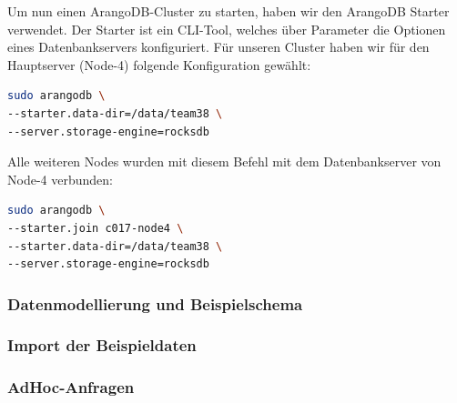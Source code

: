 Um nun einen ArangoDB-Cluster zu starten, haben wir den ArangoDB Starter verwendet. Der Starter ist ein \ac{CLI}-Tool, welches über Parameter die Optionen eines Datenbankservers konfiguriert. 
Für unseren Cluster haben wir für den Hauptserver (Node-4) folgende Konfiguration gewählt:
\begin{lstlisting}[language=bash]
sudo arangodb \
--starter.data-dir=/data/team38 \
--server.storage-engine=rocksdb
\end{lstlisting}
Alle weiteren Nodes wurden mit diesem Befehl mit dem Datenbankserver von Node-4 verbunden:
\begin{lstlisting}[language=bash]
sudo arangodb \
--starter.join c017-node4 \
--starter.data-dir=/data/team38 \
--server.storage-engine=rocksdb
\end{lstlisting}
\citep{ADB_starter}


\subsubsection{Datenmodellierung und Beispielschema}
\subsubsection{Import der Beispieldaten}
\subsubsection{AdHoc-Anfragen}